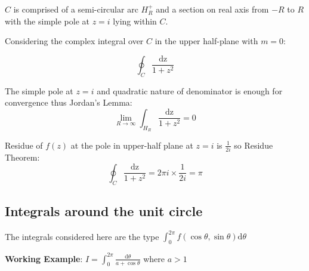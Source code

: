 \documentclass[10pt,a4paper]{article}
\begin{document}
$C$ is comprised of a semi-circular arc $H_R^+$ and a section on real axis from $-R$ to $R$ with the
simple pole at $z=i$ lying within $C$. \par 

Considering the complex integral over $C$ in the upper half-plane with $m=0$: \par
$$
\oint_C \frac{\text{dz}}{1+z^2}
$$

The simple pole at $z=i$ and quadratic nature of denominator is enough for convergence thus Jordan's
Lemma:
$$
\lim_{R\rightarrow \infty} \int_{H_R} \frac{\text{dz}}{1+z^2} = 0
$$

Residue of $f(z)$ at the pole in upper-half plane at $z=i$ is $\frac{1}{2i}$ so Residue Theorem:
$$
\oint_C \frac{\text{dz}}{1+z^2} = 2\pi i \times \frac{1}{2i} = \pi
$$

\pagebreak

\subsection{Integrals around the unit circle}

The integrals considered here are the type $\int_0^{2\pi}f(\cos \theta, \sin \theta) \text{
d}\theta$

\textbf{Working Example}: $I=\int_0^{2\pi} \frac{\text{d}\theta}{a+\cos \theta}$ where $a>1$ \par 
\end{document}
